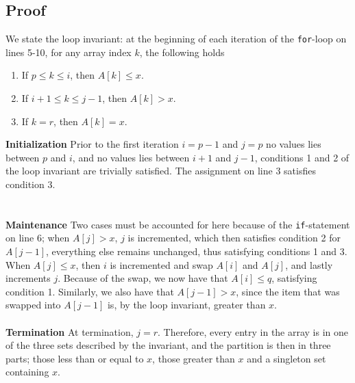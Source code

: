 \subsection{Proof}
We state the loop invariant: at the beginning of each iteration of the
\texttt{for}-loop on lines 5-10, for any array index $k$, the following
holds
\begin{enumerate}
	\item If $p \leq k \leq i$, then $A[k] \leq x$.
	\item If $i + 1 \leq k \leq j - 1$, then $A[k] > x$.
	\item If $k = r$, then $A[k] = x$.
\end{enumerate}
\noindent \textbf{Initialization} Prior to the first iteration $i = p - 1$ and
$j = p$ no values lies between $p$ and $i$, and no values lies between $i + 1$
and $j - 1$, conditions 1 and 2 of the loop invariant are trivially
satisfied. The assignment on line 3 satisfies condition 3. \\
\\\\
\noindent \textbf{Maintenance} Two cases must be accounted for here because of
the \texttt{if}-statement on line 6; when $A[j] > x$, $j$ is incremented,
which then satisfies condition 2 for $A[j - 1]$, everything else remains
unchanged, thus satisfying conditions 1 and 3. When $A[j] \leq x$, then $i$ is
incremented and swap $A[i]$ and $A[j]$, and lastly increments $j$. Because of
the swap, we now have that $A[i] \leq q$, satisfying condition 1. Similarly,
we also have that $A[j - 1] > x$, since the item that was swapped into
$A[j - 1]$ is, by the loop invariant, greater than $x$.
\\\\
\noindent \textbf{Termination} At termination, $j = r$. Therefore, every entry
in the array is in one of the three sets described by the invariant, and the
partition is then in three parts; those less than or equal to $x$, those
greater than $x$ and a singleton set containing $x$.

